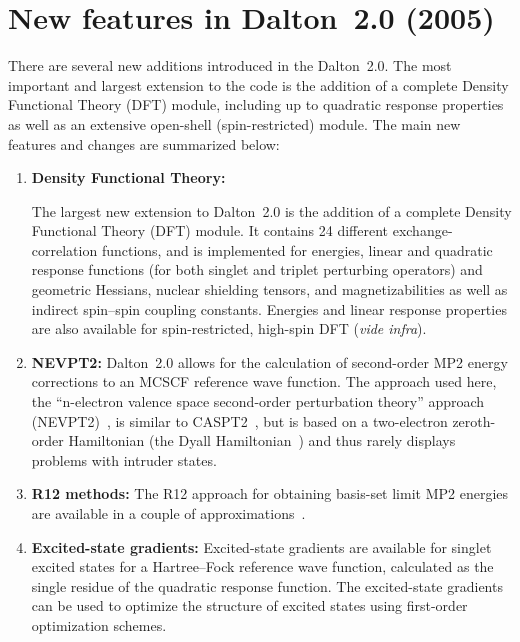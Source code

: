 \section{New features in Dalton~2.0 (2005)}

There are several new additions introduced in the Dalton~2.0. The most
important and largest extension to the code is the addition of a
complete Density Functional Theory (DFT) module, including up to quadratic
response properties as well as an extensive open-shell
(spin-restricted) module. The main new features and changes are
summarized below:

\begin{enumerate}
\item{\bf Density Functional Theory:}

The largest new extension to Dalton~2.0 is the addition of a complete
Density Functional Theory (DFT) module. It contains 24 different
exchange-correlation  functions,
 and is implemented for energies,
linear and quadratic response functions (for both singlet and triplet
perturbing operators) and geometric Hessians, nuclear shielding
tensors, and magnetizabilities as well as indirect spin--spin coupling
constants. Energies and linear response properties are also available
for spin-restricted, high-spin DFT ({\em vide infra\/}).


\item{\bf NEVPT2:} Dalton~2.0 allows for the calculation of
  second-order MP2 energy corrections to an MCSCF reference wave
  function. The approach used here, the ``n-electron valence space
  second-order perturbation theory'' approach (NEVPT2)~\cite{carcsetljpmjcp114,carcjpmcpl350,carcjpmjcp117}, is similar to
  CASPT2~\cite{kapamborjcp96}, but is based on a two-electron zeroth-order
  Hamiltonian (the Dyall Hamiltonian~\cite{kgdjcp102}) and thus rarely displays
  problems with intruder states.

\item{\bf R12 methods:} The R12 approach for obtaining basis-set limit
MP2 energies are available in a couple of  approximations~\cite{wkccmsjcp116,ccmswkthcpc149}.

\item{\bf Excited-state gradients:} Excited-state gradients are
  available for singlet excited states for a Hartree--Fock reference
  wave function, calculated as the single residue of the quadratic
  response function. The excited-state gradients can be used to
  optimize the structure of excited states using first-order
  optimization schemes.


\end{enumerate}
